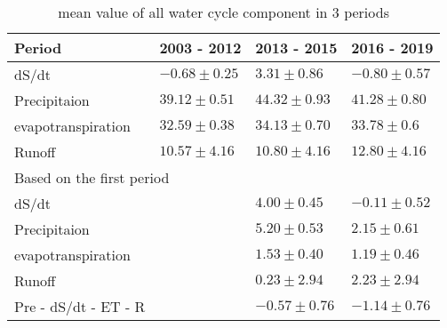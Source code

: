 \begin{table}[htbp]\centering
	\begin{tabular}{|l|l|l|l|}
		\hline
		Period &  2003 - 2012 & 2013 - 2015 & 2016 - 2019  \\ \hline
		dS/dt            & $-0.68 \pm 0.25$     & $3.31 \pm 0.86$        & $-0.80 \pm 0.57$        \\ \hline
		Precipitaion               & $39.12 \pm 0.51$      & $44.32 \pm 0.93$       &$41.28 \pm 0.80$        \\ \hline
		evapotranspiration           & $32.59 \pm 0.38$       & $34.13 \pm 0.70$       & $33.78 \pm 0.6$        \\ \hline
		Runoff                     & $10.57  \pm 4.16$      & $10.80 \pm 4.16 $     & $12.80 \pm 4.16 $      \\ \hline
		\multicolumn{4}{|l|}{Based on the first period}                                         \\ \hline
		dS/dt           &             & $4.00 \pm 0.45$        & $-0.11 \pm 0.52$        \\ \hline
		Precipitaion               &             & $5.20 \pm 0.53$        & $2.15 \pm 0.61$         \\ \hline
		evapotranspiration           &             & $1.53 \pm 0.40$        & $1.19 \pm 0.46 $        \\ \hline
		Runoff                     &             & $0.23 \pm 2.94 $       & $2.23 \pm 2.94   $      \\ \hline
		Pre - dS/dt - ET - R &             & $-0.57 \pm 0.76$       & $-1.14 \pm 0.76 $    \\ \hline 
	\end{tabular}
	\caption{mean value of all water cycle component in 3 periods}
\end{table}